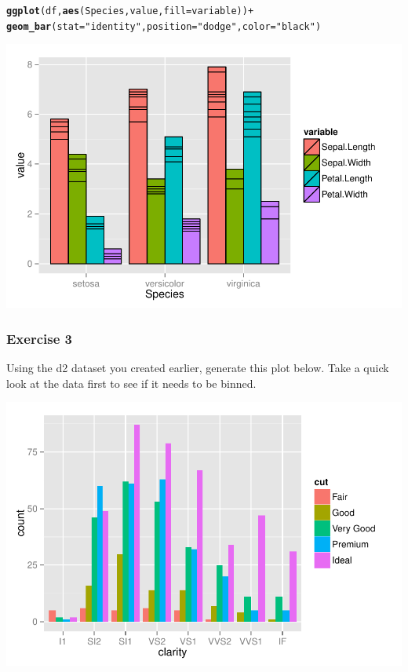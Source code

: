 \documentclass{beamer}\usepackage[]{graphicx}\usepackage[]{color}
\makeatletter
\newcommand{\hlstr}[1]{\textcolor[rgb]{0.192,0.494,0.8}{#1}}%
\newcommand{\hlopt}[1]{\textcolor[rgb]{0,0,0}{#1}}%
\newcommand{\hlstd}[1]{\textcolor[rgb]{0.345,0.345,0.345}{#1}}%
\newcommand{\hlkwc}[1]{\textcolor[rgb]{0.333,0.667,0.333}{#1}}%
\newcommand{\hlkwd}[1]{\textcolor[rgb]{0.737,0.353,0.396}{\textbf{#1}}}%
\newenvironment{kframe}{%
 \def\at@end@of@kframe{}%
 \ifinner\ifhmode%
  \def\at@end@of@kframe{\end{minipage}}%
  \begin{minipage}{\columnwidth}%
 \fi\fi%
 \def\FrameCommand##1{\hskip\@totalleftmargin \hskip-\fboxsep
 \colorbox{shadecolor}{##1}\hskip-\fboxsep
     \hskip-\linewidth \hskip-\@totalleftmargin \hskip\columnwidth}%
 \MakeFramed {\advance\hsize-\width
   \@totalleftmargin\z@ \linewidth\hsize
   \@setminipage}}%
 {\par\unskip\endMakeFramed%
 \at@end@of@kframe}
\newenvironment{knitrout}{}{} %
\makeatother
\begin{document}
\begin{frame}[fragile]
\begin{knitrout}\footnotesize
{}\color{fgcolor}\begin{kframe}
\begin{alltt}
\hlkwd{ggplot}\hlstd{(df,} \hlkwd{aes}\hlstd{(Species, value,} \hlkwc{fill} \hlstd{= variable))} \hlopt{+}
    \hlkwd{geom_bar}\hlstd{(}\hlkwc{stat} \hlstd{=} \hlstr{"identity"}\hlstd{,} \hlkwc{position}\hlstd{=}\hlstr{"dodge"}\hlstd{,} \hlkwc{color}\hlstd{=}\hlstr{"black"}\hlstd{)}
\end{alltt}
\end{kframe}

{\centering \includegraphics[width=.75\linewidth]{figure/barthree2} 

}



\end{knitrout}
\end{frame}


\begin{frame}[fragile]
\frametitle{Exercise 3}
Using the d2 dataset you created earlier, generate this plot below. Take a quick look at the data first to see if it needs to be binned.
\begin{knitrout}\footnotesize
{}\color{fgcolor}

{\centering \includegraphics[width=.75\linewidth]{figure/ex3} 

}



\end{knitrout}
\end{frame}
\end{document}
